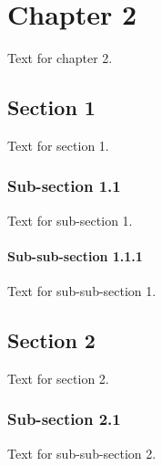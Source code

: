 \chapter{Chapter 2}\label{ch:c2}
 Text for chapter 2.

 \section{Section 1}\label{sec:c21}
 Text for section 1.

 \subsection{Sub-section 1.1}
 Text for sub-section 1.

 \subsubsection{Sub-sub-section 1.1.1}
 Text for sub-sub-section 1.

\section{Section 2}\label{sec:c22}
 Text for section 2.

 \subsection{Sub-section 2.1}
 Text for sub-sub-section 2.

